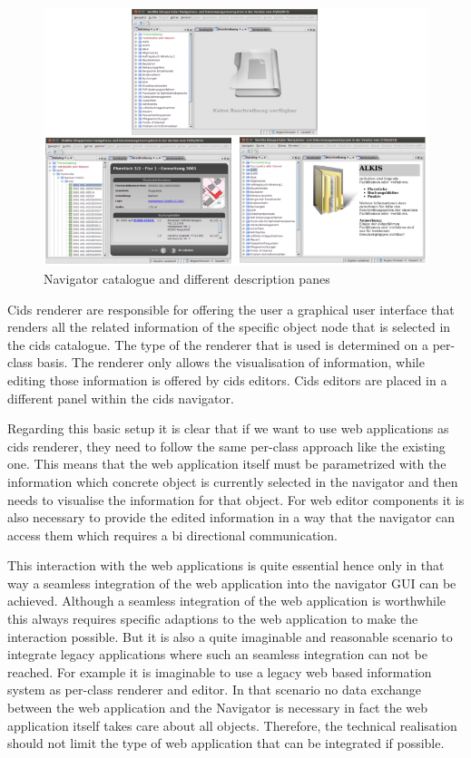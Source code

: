 \begin{figure}
	\centering \includegraphics[width=1.0\textwidth]{./img/conception/desc_panes.png}
	\caption{Navigator catalogue and different description panes}
	\label{fig:desc_panes}
\end{figure}

Cids renderer are responsible for offering the user a graphical user interface that renders all the related information of the specific object node that is selected in the cids catalogue.
The type of the renderer that is used is determined on a per-class basis.
The renderer only allows the visualisation of information, while editing those information is offered by cids editors.
Cids editors are placed in a different panel within the cids navigator.

Regarding this basic setup it is clear that if we want to use web applications as cids renderer, they need to follow the same per-class approach like the existing one.
This means that the web application itself must be parametrized with the information which concrete object is currently selected in the navigator and then needs to visualise the information for that object.
For web editor components it is also necessary to provide the edited information in a way that the navigator can access them which requires a bi directional communication.

This interaction with the web applications is quite essential hence only in that way a seamless integration of the web application into the navigator GUI can be achieved.
Although a seamless integration of the web application is worthwhile this always requires specific adaptions to the web application to make the interaction possible.
But it is also a quite imaginable and reasonable scenario to integrate legacy applications where such an seamless integration can not be reached.
For example it is imaginable to use a legacy web based information system as per-class renderer and editor.
In that scenario no data exchange between the web application and the Navigator is necessary in fact the web application itself takes care about all objects.
Therefore, the technical realisation should not limit the type of web application that can be integrated if possible.

